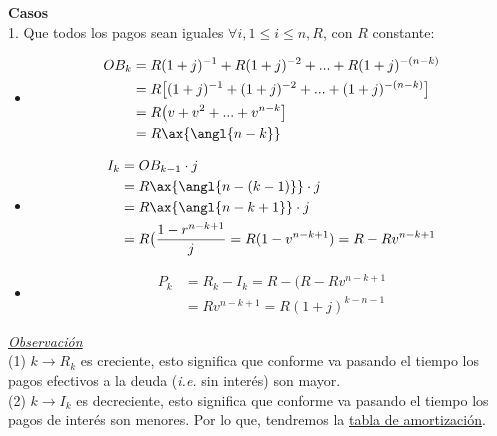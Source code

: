 \textbf{Casos}\\
1. Que todos los pagos sean iguales $\forall i, 1 \leq i \leq n, R$,  con $R$ constante:
\begin{itemize}
    \item \begin{align*} OB_k &= R(1+j)^{-1} + R(1+j)^{-2} + ... + R(1+j)^{-(n-k)}\\
    &= R\big[(1+j)^{-1} + (1+j)^{-2} +...+ (1+j)^{-(n-k)}\big]\\
    &= R\big(v+v^2+...+v^{n-k}\big]\\
    &= R\ax{\angl{n-k}}
    \end{align*}
    \item \begin{align*} I_k &= OB_{k-1}\cdot j\\
        &= R\ax{\angl{n-(k-1)}}\cdot j\\
        &= R\ax{\angl{n-k+1}}\cdot j\\
        &= R\big(\frac{1-r^{n-k+1}}{j} = R(1-v^{n-k+1}) = R - Rv^{n-k+1}
    \end{align*}
    \item \begin{align*} P_k &= R_k -I_k = R- (R-Rv^{n-k+1}\\
    &= Rv^{n-k+1} = R(1+j)^{k-n-1}
    \end{align*}
\end{itemize}

\underline{\textit{Observación}}\\
(1) $k\to R_k$ es creciente, esto significa que conforme va pasando el tiempo los pagos efectivos a la deuda (\textit{i.e.} sin interés) son mayor.\\

(2) $k\to I_k$ es decreciente, esto significa que conforme va pasando el tiempo los pagos de interés son menores. Por lo que, tendremos la \underline{tabla de amortización}.\\



